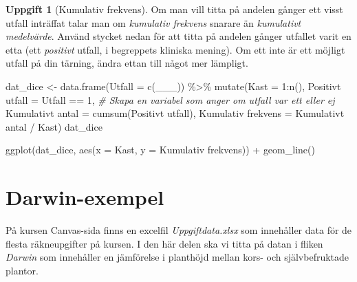 \documentclass[
]{book}
\newenvironment{Shaded}{\begin{snugshade}}{\end{snugshade}}
\newcommand{\AttributeTok}[1]{\textcolor[rgb]{0.77,0.63,0.00}{#1}}
\newcommand{\CommentTok}[1]{\textcolor[rgb]{0.56,0.35,0.01}{\textit{#1}}}
\newcommand{\DecValTok}[1]{\textcolor[rgb]{0.00,0.00,0.81}{#1}}
\newcommand{\FunctionTok}[1]{\textcolor[rgb]{0.00,0.00,0.00}{#1}}
\newcommand{\NormalTok}[1]{#1}
\newcommand{\OtherTok}[1]{\textcolor[rgb]{0.56,0.35,0.01}{#1}}
\newcommand{\SpecialCharTok}[1]{\textcolor[rgb]{0.00,0.00,0.00}{#1}}
\newcommand{\StringTok}[1]{\textcolor[rgb]{0.31,0.60,0.02}{#1}}
\theoremstyle{definition}
\theoremstyle{definition}
\theoremstyle{definition}
\newtheorem{exercise}{Uppgift}[chapter]
\theoremstyle{definition}
\theoremstyle{remark}
\begin{document}
\begin{exercise}[Kumulativ frekvens]

Om man vill titta på andelen gånger ett visst utfall inträffat talar man om \emph{kumulativ frekvens} snarare än \emph{kumulativt medelvärde}. Använd stycket nedan för att titta på andelen gånger utfallet varit en etta (ett \emph{positivt} utfall, i begreppets kliniska mening). Om ett inte är ett möjligt utfall på din tärning, ändra ettan till något mer lämpligt.

\begin{Shaded}
\begin{Highlighting}[]
\NormalTok{dat\_dice }\OtherTok{\textless{}{-}} \FunctionTok{data.frame}\NormalTok{(}\AttributeTok{Utfall =} \FunctionTok{c}\NormalTok{(\_\_\_)) }\SpecialCharTok{\%\textgreater{}\%} 
  \FunctionTok{mutate}\NormalTok{(}\AttributeTok{Kast =} \DecValTok{1}\SpecialCharTok{:}\FunctionTok{n}\NormalTok{(),}
         \StringTok{\textasciigrave{}}\AttributeTok{Positivt utfall}\StringTok{\textasciigrave{}} \OtherTok{=}\NormalTok{ Utfall }\SpecialCharTok{==} \DecValTok{1}\NormalTok{,                       }\CommentTok{\# Skapa en variabel som anger om utfall var ett eller ej}
         \StringTok{\textasciigrave{}}\AttributeTok{Kumulativt antal}\StringTok{\textasciigrave{}} \OtherTok{=} \FunctionTok{cumsum}\NormalTok{(}\StringTok{\textasciigrave{}}\AttributeTok{Positivt utfall}\StringTok{\textasciigrave{}}\NormalTok{),}
         \StringTok{\textasciigrave{}}\AttributeTok{Kumulativ frekvens}\StringTok{\textasciigrave{}} \OtherTok{=} \StringTok{\textasciigrave{}}\AttributeTok{Kumulativt antal}\StringTok{\textasciigrave{}} \SpecialCharTok{/}\NormalTok{ Kast)}
\NormalTok{dat\_dice}

\FunctionTok{ggplot}\NormalTok{(dat\_dice, }\FunctionTok{aes}\NormalTok{(}\AttributeTok{x =}\NormalTok{ Kast, }\AttributeTok{y =} \StringTok{\textasciigrave{}}\AttributeTok{Kumulativ frekvens}\StringTok{\textasciigrave{}}\NormalTok{)) }\SpecialCharTok{+}
  \FunctionTok{geom\_line}\NormalTok{()}
\end{Highlighting}
\end{Shaded}

\end{exercise}

\hypertarget{darwin-exempel}{%
\section{Darwin-exempel}\label{darwin-exempel}}

På kursen Canvas-sida finns en excelfil \emph{Uppgiftdata.xlsx} som innehåller data för de flesta räkneupgifter på kursen. I den här delen ska vi titta på datan i fliken \emph{Darwin} som innehåller en jämförelse i planthöjd mellan kors- och självbefruktade plantor.
\end{document}
